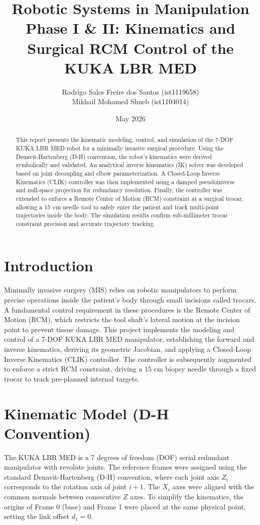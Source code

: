 \documentclass[11pt,a4paper]{article}
\title{Robotic Systems in Manipulation\\Phase I \& II: Kinematics and Surgical RCM Control of the KUKA LBR MED}
\author{Rodrigo Sales Freire dos Santos (ist1119658) \\ Mikhail Mohamed Shueb (ist1104014)}
\date{May 2026}
\begin{document}
\maketitle

\begin{abstract}
This report presents the kinematic modeling, control, and simulation of the 7-DOF KUKA LBR MED robot for a minimally invasive surgical procedure. Using the Denavit-Hartenberg (D-H) convention, the robot's kinematics were derived symbolically and validated. An analytical inverse kinematics (IK) solver was developed based on joint decoupling and elbow parameterization. A Closed-Loop Inverse Kinematics (CLIK) controller was then implemented using a damped pseudoinverse and null-space projection for redundancy resolution. Finally, the controller was extended to enforce a Remote Center of Motion (RCM) constraint at a surgical trocar, allowing a 15~cm needle tool to safely enter the patient and track multi-point trajectories inside the body. The simulation results confirm sub-millimeter trocar constraint precision and accurate trajectory tracking.
\end{abstract}

\section{Introduction}
Minimally invasive surgery (MIS) relies on robotic manipulators to perform precise operations inside the patient's body through small incisions called trocars. A fundamental control requirement in these procedures is the Remote Center of Motion (RCM), which restricts the tool shaft's lateral motion at the incision point to prevent tissue damage. 
This project implements the modeling and control of a 7-DOF KUKA LBR MED manipulator, establishing the forward and inverse kinematics, deriving its geometric Jacobian, and applying a Closed-Loop Inverse Kinematics (CLIK) controller. The controller is subsequently augmented to enforce a strict RCM constraint, driving a $15\text{ cm}$ biopsy needle through a fixed trocar to track pre-planned internal targets.

\section{Kinematic Model (D-H Convention)}
The KUKA LBR MED is a 7 degrees of freedom (DOF) serial redundant manipulator with revolute joints. The reference frames were assigned using the standard Denavit-Hartenberg (D-H) convention, where each joint axis $Z_i$ corresponds to the rotation axis of joint $i+1$. The $X_i$ axes were aligned with the common normals between consecutive $Z$ axes. To simplify the kinematics, the origins of Frame 0 (base) and Frame 1 were placed at the same physical point, setting the link offset $d_1 = 0$.
\end{document}
